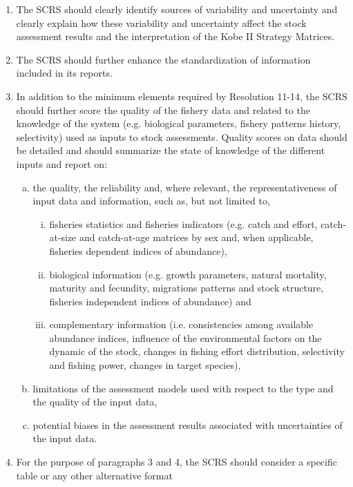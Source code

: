 \documentclass[a4paper, 10pt]{article}
\begin{document}
 \begin{enumerate}
  \item The SCRS should clearly identify sources of variability and uncertainty and clearly explain how these variability and uncertainty 
        affect the stock assessment results and the interpretation of the Kobe II Strategy Matrices. 
  \item The SCRS should further enhance the standardization of information included in its reports.
  \item In addition to the minimum elements required by Resolution 11-14, the SCRS should further score the quality of the fishery 
        data and related to the knowledge of the system (e.g. biological parameters, fishery patterns history, selectivity) used as 
        inputs to stock assessments. Quality scores on data should be detailed and should summarize the state of knowledge of the 
        different inputs and report on:
  \begin{enumerate}[(a)]
    \item the quality, the reliability and, where relevant, the representativeness of input data and information, such as, but 
          not limited to, 
      \begin{enumerate}[(i)]
      \item fisheries statistics and fisheries indicators (e.g. catch and effort, catch-at-size and catch-at-age matrices 
          by sex and, when applicable, fisheries dependent indices of abundance), 
      \item biological information (e.g. growth parameters, 
          natural mortality, maturity and fecundity, migrations patterns and stock structure, fisheries independent indices of abundance) 
          and 
      \item complementary information (i.e. consistencies among available abundance indices, influence of the environmental factors 
          on the dynamic of the stock, changes in fishing effort distribution, selectivity and fishing power, changes in target species),
    \end{enumerate}
    \item limitations of the assessment models used with respect to the type and the quality of the input data,
    \item potential biases in the assessment results associated with uncertainties of the input data.
  \end{enumerate}
  \item For the purpose of paragraphs 3 and 4, the SCRS should consider a specific table or any other alternative format 

\end{enumerate}
\end{document}
